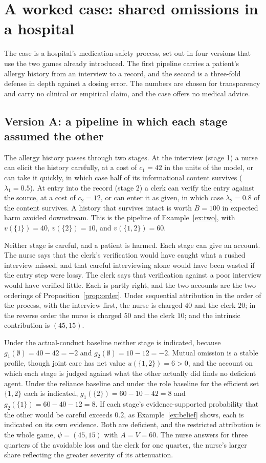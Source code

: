 \documentclass[11pt]{article}
\theoremstyle{plain}
\theoremstyle{definition}
\begin{document}
\section{A worked case: shared omissions in a hospital}\label{sec:worked}

The case is a hospital's medication-safety process, set out in four versions that use the two games already introduced. The first pipeline carries a patient's allergy history from an interview to a record, and the second is a three-fold defense in depth against a dosing error. The numbers are chosen for transparency and carry no clinical or empirical claim, and the case offers no medical advice.

\subsection*{Version A: a pipeline in which each stage assumed the other}

The allergy history passes through two stages. At the interview (stage 1) a nurse can elicit the history carefully, at a cost of $c_1=42$ in the units of the model, or can take it quickly, in which case half of its informational content survives ($\lambda_1=0.5$). At entry into the record (stage 2) a clerk can verify the entry against the source, at a cost of $c_2=12$, or can enter it as given, in which case $\lambda_2=0.8$ of the content survives. A history that survives intact is worth $B=100$ in expected harm avoided downstream. This is the pipeline of Example~\ref{ex:two}, with $v(\{1\})=40$, $v(\{2\})=10$, and $v(\{1,2\})=60$.

Neither stage is careful, and a patient is harmed. Each stage can give an account. The nurse says that the clerk's verification would have caught what a rushed interview missed, and that careful interviewing alone would have been wasted if the entry step were lossy. The clerk says that verification against a poor interview would have verified little. Each is partly right, and the two accounts are the two orderings of Proposition~\ref{prop:order}. Under sequential attribution in the order of the process, with the interview first, the nurse is charged $40$ and the clerk $20$; in the reverse order the nurse is charged $50$ and the clerk $10$; and the intrinsic contribution is $(45,15)$.

Under the actual-conduct baseline neither stage is indicated, because $g_1(\emptyset)=40-42=-2$ and $g_2(\emptyset)=10-12=-2$. Mutual omission is a stable profile, though joint care has net value $u(\{1,2\})=6>0$, and the account on which each stage is judged against what the other actually did finds no deficient agent. Under the reliance baseline and under the role baseline for the efficient set $\{1,2\}$ each is indicated, $g_1(\{2\})=60-10-42=8$ and $g_2(\{1\})=60-40-12=8$. If each stage's evidence-supported probability that the other would be careful exceeds $0.2$, as Example~\ref{ex:belief} shows, each is indicated on its own evidence. Both are deficient, and the restricted attribution is the whole game, $\psi=(45,15)$ with $A=V=60$. The nurse answers for three quarters of the avoidable loss and the clerk for one quarter, the nurse's larger share reflecting the greater severity of its attenuation.
\end{document}
